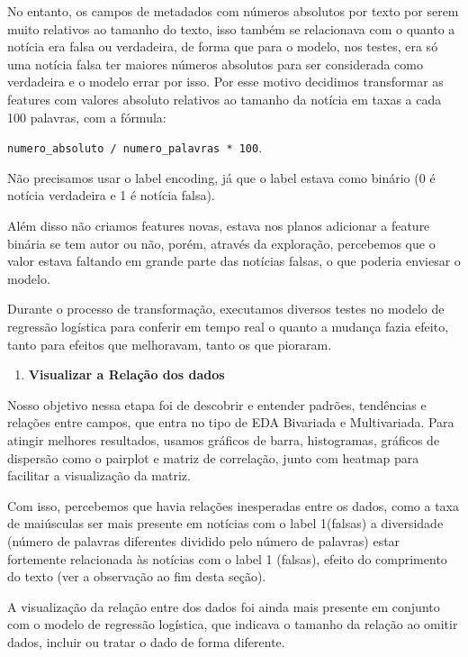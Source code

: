 \documentclass[
  brazilian,
  11pt,
]{article}
\providecommand{\tightlist}{%
  \setlength{\itemsep}{0pt}\setlength{\parskip}{0pt}}
\begin{document}
No entanto, os campos de metadados com números absolutos por texto por serem muito relativos ao tamanho do texto, isso também se relacionava com o quanto a notícia era falsa ou verdadeira, de forma que para o modelo, nos testes, era só uma notícia falsa ter maiores números absolutos para ser considerada como verdadeira e o modelo errar por isso. Por esse motivo decidimos transformar as features com valores absoluto relativos ao tamanho da notícia em taxas a cada 100 palavras, com a fórmula:

\texttt{numero\_absoluto\ /\ numero\_palavras\ *\ 100}.

Não precisamos usar o label encoding, já que o label estava como binário (0 é notícia verdadeira e 1 é notícia falsa).

Além disso não criamos features novas, estava nos planos adicionar a feature binária se tem autor ou não, porém, através da exploração, percebemos que o valor estava faltando em grande parte das notícias falsas, o que poderia enviesar o modelo.

Durante o processo de transformação, executamos diversos testes no modelo de regressão logística para conferir em tempo real o quanto a mudança fazia efeito, tanto para efeitos que melhoravam, tanto os que pioraram.

\begin{enumerate}
\def\labelenumi{\arabic{enumi}.}
\tightlist
\setcounter{enumi}{5}
\item
  \textbf{Visualizar a Relação dos dados}
\end{enumerate}

Nosso objetivo nessa etapa foi de descobrir e entender padrões, tendências e relações entre campos, que entra no tipo de EDA Bivariada e Multivariada. Para atingir melhores resultados, usamos gráficos de barra, histogramas, gráficos de dispersão como o pairplot e matriz de correlação, junto com heatmap para facilitar a visualização da matriz.

Com isso, percebemos que havia relações inesperadas entre os dados, como a taxa de maiúsculas ser mais presente em notícias com o label 1(falsas) a diversidade (número de palavras diferentes dividido pelo número de palavras) estar fortemente relacionada às notícias com o label 1 (falsas), efeito do comprimento do texto (ver a observação ao fim desta seção).

A visualização da relação entre dos dados foi ainda mais presente em conjunto com o modelo de regressão logística, que indicava o tamanho da relação ao omitir dados, incluir ou tratar o dado de forma diferente.
\end{document}
